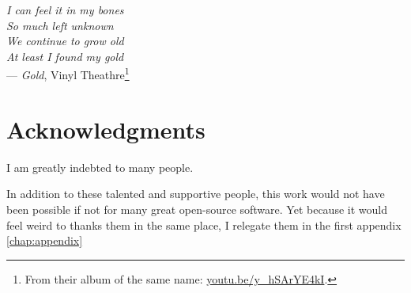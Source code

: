 
\begin{flushright}{\slshape    
		I can feel it in my bones \\
		So much left unknown \\
		We continue to grow old \\
		At least I found my gold
    } \\ \medskip
    --- \emph{Gold}, Vinyl Theathre\footnote{From their album of the same
	    name: \href{http://youtu.be/y_hSArYE4kI?t=2m47s}%
	    {\url{youtu.be/y_hSArYE4kI}}.}
\end{flushright}

\bigskip

\begingroup
\let\clearpage\relax
\let\cleardoublepage\relax
\let\cleardoublepage\relax
\chapter*{Acknowledgments}

I am greatly indebted to many people.

In addition to these talented and supportive people, this work would not have
been possible if not for many great open-source software. Yet because it would
feel weird to thanks them in the same place, I relegate them in the first
appendix \autoref{chap:appendix}

\endgroup



